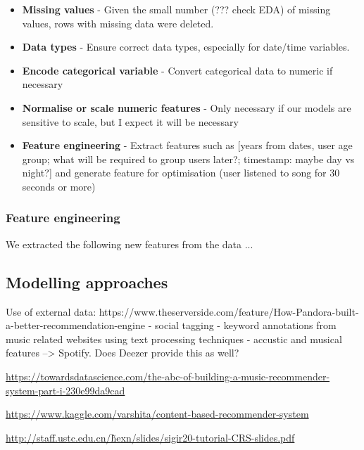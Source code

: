 \documentclass[
]{ceurart}
\begin{document}
\begin{itemize}
    \item \textbf{Missing values} - Given the small number (??? check EDA) of missing values, rows with missing data were deleted.
    \item \textbf{Data types} - Ensure correct data types, especially for date/time variables.
    \item \textbf{Encode categorical variable} - Convert categorical data to numeric if necessary
    \item \textbf{Normalise or scale numeric features} - Only necessary if our models are sensitive to scale, but I expect it will be necessary
    \item \textbf{Feature engineering} - Extract features such as [years from dates, user age group; what will be required to group users later?; timestamp: maybe day vs night?] and generate feature for optimisation (user listened to song for 30 seconds or more)
\end{itemize}

\subsubsection{Feature engineering}

We extracted the following new features from the data ...



\subsection{Modelling approaches}


Use of external data: https://www.theserverside.com/feature/How-Pandora-built-a-better-recommendation-engine
- social tagging
- keyword annotations from music related websites using text processing techniques
- accustic and musical features --> Spotify. Does Deezer provide this as well?

\href{https://towardsdatascience.com/the-abc-of-building-a-music-recommender-system-part-i-230e99da9cad}{https://towardsdatascience.com/the-abc-of-building-a-music-recommender-system-part-i-230e99da9cad}

\href{https://www.kaggle.com/varshita/content-based-recommender-system}{https://www.kaggle.com/varshita/content-based-recommender-system}

\href{http://staff.ustc.edu.cn/~hexn/slides/sigir20-tutorial-CRS-slides.pdf}{http://staff.ustc.edu.cn/\~hexn/slides/sigir20-tutorial-CRS-slides.pdf} 
\end{document}

